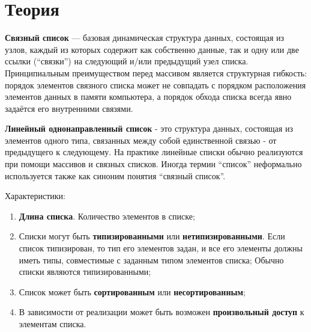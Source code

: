 \section{Теория}
\DeclareRobustCommand{\c}[1]{
\begin{center}
{#1}
\end{center}
}
\par
{\bf Связный список} — базовая динамическая структура данных, состоящая из 
узлов, каждый из которых содержит как собственно данные, так и одну или две
 ссылки (``связки'') на следующий и/или предыдущий узел списка. 
Принципиальным преимуществом перед массивом является структурная гибкость: 
порядок элементов связного списка может не совпадать с порядком расположения 
элементов данных в памяти компьютера, а порядок обхода списка всегда явно 
задаётся его внутренними связями.

{\bf Линейный однонаправленный список} - это структура данных, состоящая 
из элементов одного типа, связанных между собой единственной связью -
от предыдущего к следующему.
На практике линейные списки обычно реализуются при помощи массивов и 
связных списков. Иногда термин ``список'' неформально используется 
также как синоним понятия ``связный список''.

Характеристики:

\begin{enumerate}
  \item {\bf Длина списка}. Количество элементов в списке;
  \item Списки могут быть {\bf типизированными} или {\bf нетипизированными}. 
        Если 
        список типизирован, то тип его элементов задан, и все его элементы 
        должны иметь типы, совместимые с заданным типом элементов списка;
        Обычно списки являются типизированными;
  \item Список может быть {\bf сортированным} или {\bf несортированным};
  \item В зависимости от реализации может быть возможен {\bf произвольный доступ} к 
        элементам списка.
\end{enumerate}
\pagebreak

